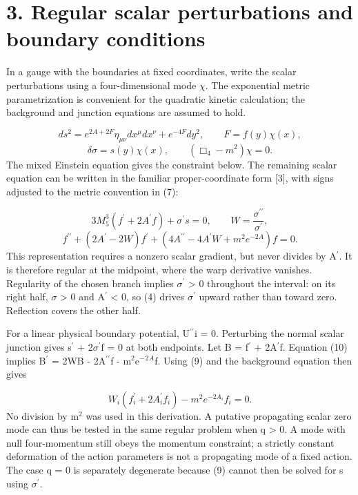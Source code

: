 \documentclass[11pt]{article}
\begin{document}
\section*{3. Regular scalar perturbations and boundary conditions}
In a gauge with the boundaries at fixed coordinates, write the scalar perturbations using a four-dimensional mode \(\chi\). The exponential metric parametrization is convenient for the quadratic kinetic calculation; the background and junction equations are assumed to hold.

\begin{equation}
ds^2=e^{2A+2F}\eta_{\mu\nu}dx^\mu dx^\nu+e^{-4F}dy^2,\qquad F=f(y)\chi(x),\tag{7}
\end{equation}
\begin{equation}
\delta\sigma=s(y)\chi(x),\qquad (\Box_4-m^2)\chi=0.\tag{8}
\end{equation}
The mixed Einstein equation gives the constraint below. The remaining scalar equation can be written in the familiar proper-coordinate form [3], with signs adjusted to the metric convention in (7):

\begin{equation}
3M_5^3(f^\prime+2A^\prime f)+\sigma^\prime s=0,\qquad W=\frac{\sigma^{\prime\prime}}{\sigma^\prime},\tag{9}
\end{equation}
\begin{equation}
f^{\prime\prime}+(2A^\prime-2W)f^\prime+(4A^{\prime\prime}-4A^\prime W+m^2e^{-2A})f=0.\tag{10}
\end{equation}
This representation requires a nonzero scalar gradient, but never divides by A\({}^\prime\). It is therefore regular at the midpoint, where the warp derivative vanishes. Regularity of the chosen branch implies \(\sigma\)\({}^\prime\) > 0 throughout the interval: on its right half, \(\sigma\) > 0 and A\({}^\prime\) < 0, so (4) drives \(\sigma\)\({}^\prime\) upward rather than toward zero. Reflection covers the other half.

For a linear physical boundary potential, U\({}^{\prime\prime}\)i = 0. Perturbing the normal scalar junction gives s\({}^\prime\) + 2\(\sigma\)\({}^\prime\)f = 0 at both endpoints. Let B = f\({}^\prime\) + 2A\({}^\prime\)f. Equation (10) implies B\({}^\prime\) = 2WB - 2A\({}^{\prime\prime}\)f - m\({}^2\)e\({}^-\)\({}^2\)\({}^A\)f. Using (9) and the background equation then gives

\begin{equation}
W_i(f_i^\prime+2A_i^\prime f_i)-m^2e^{-2A_i}f_i=0.\tag{11}
\end{equation}
No division by m\({}^2\) was used in this derivation. A putative propagating scalar zero mode can thus be tested in the same regular problem when q > 0. A mode with null four-momentum still obeys the momentum constraint; a strictly constant deformation of the action parameters is not a propagating mode of a fixed action. The case q = 0 is separately degenerate because (9) cannot then be solved for s using \(\sigma\)\({}^\prime\).
\end{document}
